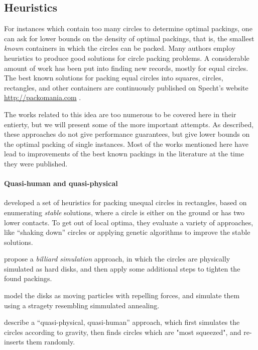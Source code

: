 \documentclass[a4paper,style=print,bibliography=totoc,nexus,lnum,extramargin]{tubsbook}
\begin{document}
\subsection{Heuristics}

For instances which contain too many circles to determine optimal packings, one can ask for lower bounds on the density of optimal packings, that is, the smallest \emph{known} containers in which the circles can be packed.
Many authors employ heuristics to produce good solutions for circle packing problems.
A considerable amount of work has been put into finding new records, mostly for equal circles. The best known solutions for packing equal circles into squares, circles, rectangles, and other containers are continuously published on Specht's website \url{http://packomania.com} \cite{specht2015packomania}.

The works related to this idea are too numerous to be covered here in their entierty, but we will present some of the more important attempts. As described, these approaches do not give performance guarantees, but give lower bounds on the optimal packing of single instances. Most of the works mentioned here have lead to improvements of the best known packings in the literature at the time they were published.

\paragraph{Quasi-human and quasi-physical}

\textcite{GGL1995packing} developed a set of heuristics for packing unequal circles in rectangles, based on enumerating \emph{stable} solutions, where a circle is either on the ground or has two lower contacts. To get out of local optima, they evaluate a variety of approaches, like “shaking down” circles or applying genetic algorithms to improve the stable solutions.

\textcite{GLNO1998dense} propose a \emph{billiard simulation} approach, in which the circles are physically simulated as hard disks, and then apply some additional steps to tighten the found packings.

\textcite{BDGL2000improving} model the disks as moving particles with repelling forces, and simulate them using a stragety resembling simmulated annealing.

\textcite{WHZX2002improved} describe a “quasi-physical, quasi-human” approach, which first simulates the circles according to gravity, then finds circles which are "most squeezed", and re-inserts them randomly.
\end{document}
